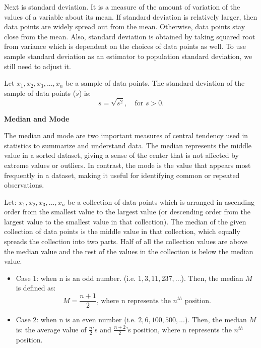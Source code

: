\noindent
Next is standard deviation. It is a measure of the amount of variation of the values of a variable about its mean. If standard deviation is relatively larger, then data points are widely spread out from the mean. Otherwise, data points stay close from the mean. Also, standard deviation is obtained by taking squared root from variance which is dependent on the choices of data points as well. To use sample standard deviation as an estimator to population standard deviation, we still need to adjust it.

\begin{definition}
Let $x_1, x_2, x_3, ..., x_n$ be a sample of data points. The standard deviation of the sample of data points ($s$) is: \[ s = \sqrt{s^2}, \quad \text{for } s > 0.\]
\end{definition}

\noindent
\textbf{Median and Mode}

\noindent
The median and mode are two important measures of central tendency used in statistics to summarize and understand data. The median represents the middle value in a sorted dataset, giving a sense of the center that is not affected by extreme values or outliers. In contrast, the mode is the value that appears most frequently in a dataset, making it useful for identifying common or repeated observations.

\begin{definition}[Median]
Let: $x_1, x_2, x_3, ... , x_n$ be a collection of data points which is arranged in ascending order from the smallest value to the largest value (or descending order from the largest value to the smallest value in that collection). The median of the given collection of data points is the middle value in that collection, which equally spreads the collection into two parts. Half of all the collection values are above the median value and the rest of the values in the collection is below the median value.
\begin{itemize}
 \item Case 1: when n is an odd number. (i.e. $1, 3, 11, 237,...$). Then, the median $M$ is defined as: \[ M = \frac{n+1}{2} \text{, where n represents the $n^{th}$ position}.\]
 \item Case 2: when n is an even number (i.e. $2, 6, 100, 500,...$). Then, the median $M$ is: the average value of $\frac{n}{2}$'s and $\frac{n+2}{2}$'s position, where n represents the $n^{th}$ position.
 \end{itemize}
\end{definition}

